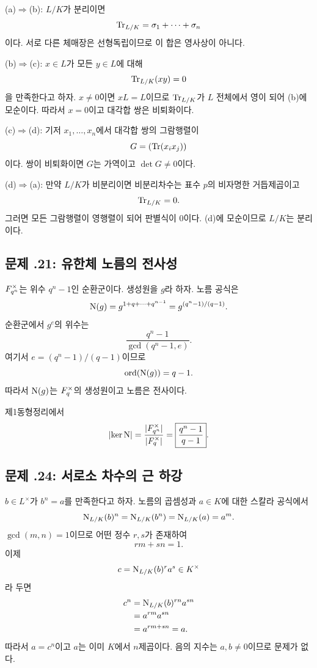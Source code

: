 \begin{solution}
(a)$\Rightarrow$(b): $L/K$가 분리이면
\[
  \operatorname{Tr}_{L/K}
  =\sigma_1+\cdots+\sigma_n
\]
이다. 서로 다른 체매장은 선형독립이므로 이 합은 영사상이 아니다.

(b)$\Rightarrow$(c): $x\in L$가 모든 $y\in L$에 대해
\[
  \operatorname{Tr}_{L/K}(xy)=0
\]
을 만족한다고 하자. $x\ne0$이면 $xL=L$이므로
$\operatorname{Tr}_{L/K}$가 $L$ 전체에서 영이 되어 (b)에 모순이다.
따라서 $x=0$이고 대각합 쌍은 비퇴화이다.

(c)$\Rightarrow$(d): 기저 $x_1,\dots,x_n$에서 대각합 쌍의
그람행렬이
\[
  G=(\operatorname{Tr}(x_ix_j))
\]
이다. 쌍이 비퇴화이면 $G$는 가역이고 $\det G\ne0$이다.

(d)$\Rightarrow$(a): 만약 $L/K$가 비분리이면 비분리차수는
표수 $p$의 비자명한 거듭제곱이고
\[
  \operatorname{Tr}_{L/K}=0.
\]
그러면 모든 그람행렬이 영행렬이 되어 판별식이 $0$이다.
(d)에 모순이므로 $L/K$는 분리이다.
\end{solution}

\subsection*{문제 \thechapter.21: 유한체 노름의 전사성}

\begin{solution}
$F_{q^n}^\times$는 위수 $q^n-1$인 순환군이다.
생성원을 $g$라 하자. 노름 공식은
\[
  \operatorname{N}(g)
  =g^{1+q+\cdots+q^{n-1}}
  =g^{(q^n-1)/(q-1)}.
\]
순환군에서 $g^e$의 위수는
\[
  \frac{q^n-1}{\gcd(q^n-1,e)}.
\]
여기서 $e=(q^n-1)/(q-1)$이므로
\[
  \operatorname{ord}(\operatorname{N}(g))=q-1.
\]
따라서 $\operatorname{N}(g)$는 $F_q^\times$의 생성원이고 노름은 전사이다.

제1동형정리에서
\[
  \left|\ker\operatorname{N}\right|
  =\frac{|F_{q^n}^\times|}{|F_q^\times|}
  =\boxed{\frac{q^n-1}{q-1}}.
\]
\end{solution}

\subsection*{문제 \thechapter.24: 서로소 차수의 근 하강}

\begin{solution}
$b\in L^\times$가 $b^n=a$를 만족한다고 하자. 노름의 곱셈성과
$a\in K$에 대한 스칼라 공식에서
\[
  \operatorname{N}_{L/K}(b)^n
  =\operatorname{N}_{L/K}(b^n)
  =\operatorname{N}_{L/K}(a)
  =a^m.
\]
$\gcd(m,n)=1$이므로 어떤 정수 $r,s$가 존재하여
\[
  rm+sn=1.
\]
이제
\[
  c=\operatorname{N}_{L/K}(b)^r a^s\in K^\times
\]
라 두면
\[
\begin{aligned}
  c^n
  &=\operatorname{N}_{L/K}(b)^{rn}a^{sn}\\
  &=a^{rm}a^{sn}\\
  &=a^{rm+sn}=a.
\end{aligned}
\]
따라서 $a=c^n$이고 $a$는 이미 $K$에서 $n$제곱이다.
음의 지수는 $a,b\ne0$이므로 문제가 없다.
\end{solution}

